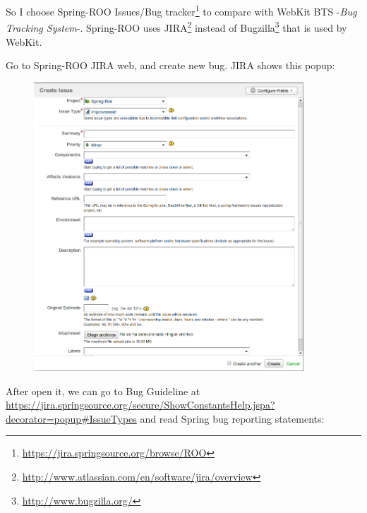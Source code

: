 \documentclass[11pt]{scrartcl}
\begin{document}
\par So I choose Spring-ROO Issues/Bug tracker\footnote{\url{https://jira.springsource.org/browse/ROO}} to compare with WebKit BTS -\emph{Bug Tracking System}-. Spring-ROO uses JIRA\footnote{\url{http://www.atlassian.com/en/software/jira/overview}} instead of Bugzilla\footnote{\url{http://www.bugzilla.org/}} that is used by WebKit.

\par Go to Spring-ROO JIRA web, and create new bug. JIRA shows this popup:

\begin{figure}[htp]
    \begin{flushright}	
        \includegraphics[width=0.9\textwidth]{spring-roo-jira-bug-tracker.png}
        \label{fig:spring-roo-jira}
    \end{flushright}
\end{figure}

\par After open it, we can go to Bug Guideline at \url{https://jira.springsource.org/secure/ShowConstantsHelp.jspa?decorator=popup#IssueTypes} and read Spring bug reporting statements:
\end{document}
